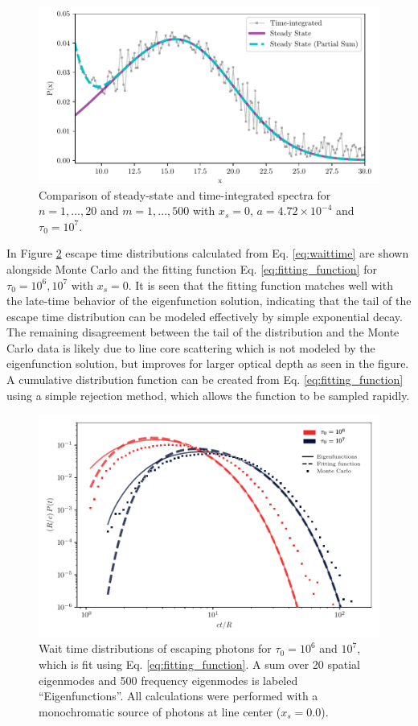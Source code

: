 \documentclass{aastex63}
\begin{document}
\begin{figure}
    \centering
    \includegraphics{steadystate.pdf}
    \caption{Comparison of steady-state and time-integrated spectra for $n=1, ..., 20$ and $m=1, ..., 500$ with $x_s=0$, $a = 4.72\times 10^{-4}$ and $\tau_0=10^7$.}
    \label{fig:steadystate}
\end{figure}


In Figure \ref{fig:escape_time} escape time distributions calculated from Eq. \ref{eq:waittime} are shown alongside Monte Carlo and the fitting function Eq. \ref{eq:fitting_function} for $\tau_0=10^6, 10^7$ with $x_s=0$. It is seen that the fitting function matches well with the late-time behavior of the eigenfunction solution, indicating that the tail of the escape time distribution can be modeled effectively by simple exponential decay. The remaining disagreement between the tail of the distribution and the Monte Carlo data is likely due to line core scattering which is not modeled by the eigenfunction solution, but improves for larger optical depth as seen in the figure. A cumulative distribution function can be created from Eq. \ref{eq:fitting_function} using a simple rejection method, which allows the function to be sampled rapidly.

\begin{figure}
    \centering
    \includegraphics{waittime.pdf}
    \caption{Wait time distributions of escaping photons for $\tau_0=10^6$ and $10^7$, which is fit using Eq. \ref{eq:fitting_function}. A sum over 20 spatial eigenmodes and 500 frequency eigenmodes is labeled ``Eigenfunctions''. All calculations were performed with a monochromatic source of photons at line center ($x_s = 0.0$).}
    \label{fig:escape_time}
\end{figure}
\end{document}
